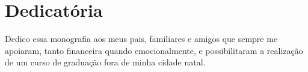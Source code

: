 \chapter*{Dedicatória}

Dedico essa monografia aos meus pais, familiares e amigos que sempre me apoiaram, tanto financeira quando emocionalmente, e possibilitaram a realização de um curso de graduação fora de minha cidade natal.

